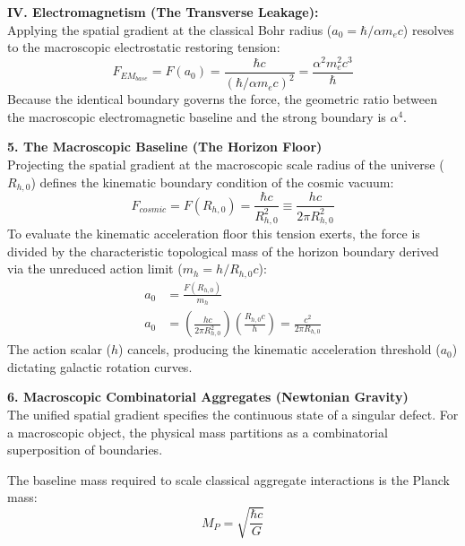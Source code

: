 \textbf{IV. Electromagnetism (The Transverse Leakage):} \\
Applying the spatial gradient at the classical Bohr radius ($a_0 = \hbar / \alpha m_e c$) resolves to the macroscopic electrostatic restoring tension:
\begin{equation}
    F_{EM_{base}} = F(a_0) = \frac{\hbar c}{(\hbar / \alpha m_e c)^2} = \frac{\alpha^2 m_e^2 c^3}{\hbar}
\end{equation}
Because the identical boundary governs the force, the geometric ratio between the macroscopic electromagnetic baseline and the strong boundary is $\alpha^4$.

\vspace{0.2 cm}

\textbf{5. The Macroscopic Baseline (The Horizon Floor)} \\
Projecting the spatial gradient at the macroscopic scale radius of the universe ($R_{h,0}$) defines the kinematic boundary condition of the cosmic vacuum:
\begin{equation}
    F_{cosmic} = F(R_{h,0}) = \frac{\hbar c}{R_{h,0}^2} \equiv \frac{h c}{2\pi R_{h,0}^2}
\end{equation}
To evaluate the kinematic acceleration floor this tension exerts, the force is divided by the characteristic topological mass of the horizon boundary derived via the unreduced action limit ($m_h = h / R_{h,0} c$): 
\begin{align}
    a_0 &= \frac{F(R_{h,0})}{m_h} \nonumber \\
    a_0 &= \left( \frac{h c}{2\pi R_{h,0}^2} \right) \left( \frac{R_{h,0} c}{h} \right) = \frac{c^2}{2\pi R_{h,0}} 
\end{align}
The action scalar ($h$) cancels, producing the kinematic acceleration threshold ($a_0$) dictating galactic rotation curves.

\vspace{0.2 cm}

\textbf{6. Macroscopic Combinatorial Aggregates (Newtonian Gravity)} \\
The unified spatial gradient specifies the continuous state of a singular defect. For a macroscopic object, the physical mass partitions as a combinatorial superposition of boundaries.

The baseline mass required to scale classical aggregate interactions is the Planck mass:
\begin{equation}
    M_P = \sqrt{\frac{\hbar c}{G}}
\end{equation}

